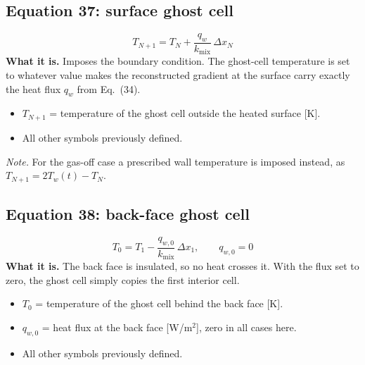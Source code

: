 \documentclass[11pt]{article}
\begin{document}
\subsection*{Equation 37: surface ghost cell}
\begin{equation}
T_{N+1} = T_N + \frac{q_w}{k_{\mathrm{mix}}}\, \Delta x_N
\end{equation}
\textbf{What it is.} Imposes the boundary condition. The ghost-cell temperature
is set to whatever value makes the reconstructed gradient at the surface carry
exactly the heat flux $q_w$ from Eq.~(34).
\begin{itemize}
  \item $T_{N+1}$ = temperature of the ghost cell outside the heated surface [K].
  \item All other symbols previously defined.
\end{itemize}
\textit{Note.} For the gas-off case a prescribed wall temperature is imposed
instead, as $T_{N+1} = 2T_w(t) - T_N$.

\subsection*{Equation 38: back-face ghost cell}
\begin{equation}
T_0 = T_1 - \frac{q_{w,0}}{k_{\mathrm{mix}}}\, \Delta x_1, \qquad q_{w,0} = 0
\end{equation}
\textbf{What it is.} The back face is insulated, so no heat crosses it. With the
flux set to zero, the ghost cell simply copies the first interior cell.
\begin{itemize}
  \item $T_0$ = temperature of the ghost cell behind the back face [K].
  \item $q_{w,0}$ = heat flux at the back face [W/m$^2$], zero in all cases here.
  \item All other symbols previously defined.
\end{itemize}
\end{document}
